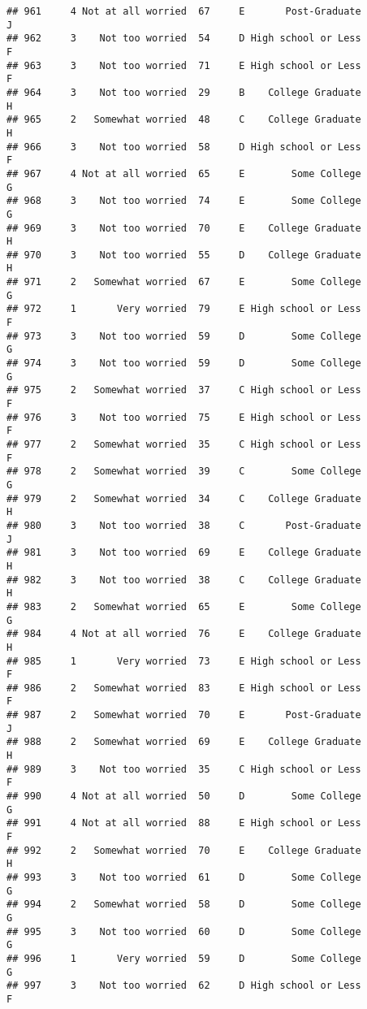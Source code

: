 \documentclass[
]{article}
\begin{document}
\begin{verbatim}
## 961     4 Not at all worried  67     E       Post-Graduate         J
## 962     3    Not too worried  54     D High school or Less         F
## 963     3    Not too worried  71     E High school or Less         F
## 964     3    Not too worried  29     B    College Graduate         H
## 965     2   Somewhat worried  48     C    College Graduate         H
## 966     3    Not too worried  58     D High school or Less         F
## 967     4 Not at all worried  65     E        Some College         G
## 968     3    Not too worried  74     E        Some College         G
## 969     3    Not too worried  70     E    College Graduate         H
## 970     3    Not too worried  55     D    College Graduate         H
## 971     2   Somewhat worried  67     E        Some College         G
## 972     1       Very worried  79     E High school or Less         F
## 973     3    Not too worried  59     D        Some College         G
## 974     3    Not too worried  59     D        Some College         G
## 975     2   Somewhat worried  37     C High school or Less         F
## 976     3    Not too worried  75     E High school or Less         F
## 977     2   Somewhat worried  35     C High school or Less         F
## 978     2   Somewhat worried  39     C        Some College         G
## 979     2   Somewhat worried  34     C    College Graduate         H
## 980     3    Not too worried  38     C       Post-Graduate         J
## 981     3    Not too worried  69     E    College Graduate         H
## 982     3    Not too worried  38     C    College Graduate         H
## 983     2   Somewhat worried  65     E        Some College         G
## 984     4 Not at all worried  76     E    College Graduate         H
## 985     1       Very worried  73     E High school or Less         F
## 986     2   Somewhat worried  83     E High school or Less         F
## 987     2   Somewhat worried  70     E       Post-Graduate         J
## 988     2   Somewhat worried  69     E    College Graduate         H
## 989     3    Not too worried  35     C High school or Less         F
## 990     4 Not at all worried  50     D        Some College         G
## 991     4 Not at all worried  88     E High school or Less         F
## 992     2   Somewhat worried  70     E    College Graduate         H
## 993     3    Not too worried  61     D        Some College         G
## 994     2   Somewhat worried  58     D        Some College         G
## 995     3    Not too worried  60     D        Some College         G
## 996     1       Very worried  59     D        Some College         G
## 997     3    Not too worried  62     D High school or Less         F

\end{verbatim}
\end{document}
